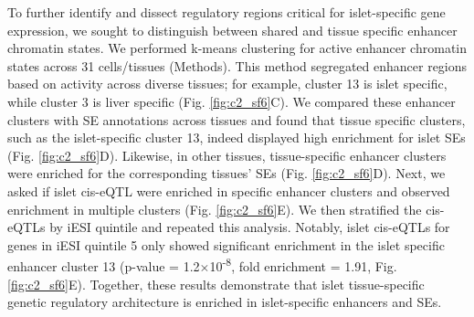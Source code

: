 To further identify and dissect regulatory regions critical for islet-specific gene expression, we sought to distinguish between shared and tissue specific enhancer chromatin states. We performed k-means clustering for active enhancer chromatin states across 31 cells/tissues (Methods). This method segregated enhancer regions based on activity across diverse tissues; for example, cluster 13 is islet specific, while cluster 3 is liver specific (Fig. \ref{fig:c2_sf6}C). We compared these enhancer clusters with SE annotations across tissues and found that tissue specific clusters, such as the islet-specific cluster 13, indeed displayed high enrichment for islet SEs (Fig. \ref{fig:c2_sf6}D). Likewise, in other tissues, tissue-specific enhancer clusters were enriched for the corresponding tissues’ SEs (Fig. \ref{fig:c2_sf6}D). Next, we asked if islet cis-eQTL were enriched in specific enhancer clusters and observed enrichment in multiple clusters (Fig. \ref{fig:c2_sf6}E). We then stratified the cis-eQTLs by iESI quintile and repeated this analysis. Notably, islet cis-eQTLs for genes in iESI quintile 5 only showed significant enrichment in the islet specific enhancer cluster 13 (p-value = 1.2$\times$10\textsuperscript{-8}, fold enrichment = 1.91, Fig. \ref{fig:c2_sf6}E). Together, these results demonstrate that islet tissue-specific genetic regulatory architecture is enriched in islet-specific enhancers and SEs.

